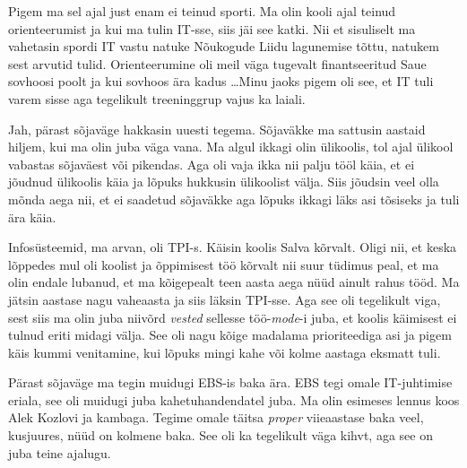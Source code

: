 
Pigem ma sel ajal just enam ei teinud sporti. Ma olin kooli ajal teinud orienteerumist ja kui ma tulin IT-sse, siis jäi see katki. Nii et sisuliselt ma vahetasin  spordi IT vastu natuke Nõukogude Liidu lagunemise tõttu, natukem sest arvutid tulid. Orienteerumine oli meil väga tugevalt finantseeritud Saue sovhoosi poolt ja kui sovhoos ära kadus \ldots Minu jaoks pigem oli see, et IT tuli varem sisse aga tegelikult treeninggrup vajus ka laiali.


Jah, pärast sõjaväge hakkasin uuesti tegema. Sõjaväkke ma sattusin aastaid hiljem, kui ma olin juba väga vana.  Ma algul ikkagi olin ülikoolis, tol ajal ülikool vabastas sõjaväest või pikendas. Aga oli vaja ikka nii palju tööl käia, et  ei jõudnud ülikoolis käia ja  lõpuks hukkusin  ülikoolist välja. Siis jõudsin veel olla mõnda aega nii, et ei saadetud sõjaväkke aga lõpuks ikkagi läks asi tõsiseks  ja tuli ära käia. 


Infosüsteemid, ma arvan, oli TPI-s. Käisin koolis Salva kõrvalt. Oligi nii, et keska lõppedes mul oli koolist ja õppimisest töö kõrvalt nii suur tüdimus peal, et ma olin endale lubanud, et ma kõigepealt teen aasta aega nüüd ainult rahus tööd. Ma jätsin aastase nagu vaheaasta ja siis läksin TPI-sse. Aga see oli tegelikult viga, sest siis ma olin juba niivõrd \emph{vested} sellesse töö-\emph{mode}-i juba, et koolis käimisest ei tulnud eriti midagi välja. See oli nagu kõige madalama prioriteediga asi ja pigem käis kummi venitamine, kui lõpuks mingi kahe või kolme aastaga eksmatt tuli. 

Pärast sõjaväge ma tegin muidugi EBS-is baka ära. EBS tegi omale IT-juhtimise eriala, see oli muidugi juba kahetuhandendatel juba. Ma olin esimeses lennus koos Alek Kozlovi ja  kambaga. Tegime omale täitsa  \emph{proper} viieaastase baka veel, kusjuures, nüüd on kolmene baka. See oli ka tegelikult väga kihvt, aga see on juba teine ajalugu. 


